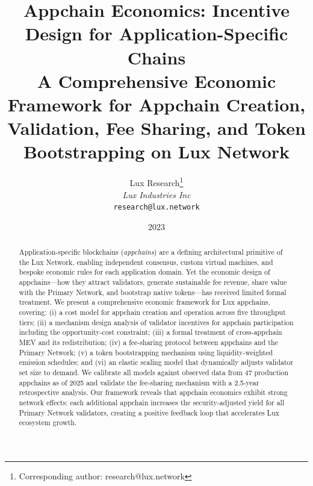 \documentclass[11pt]{article}
\title{\textbf{Appchain Economics: Incentive Design for Application-Specific Chains}\\
\large A Comprehensive Economic Framework for Appchain Creation, Validation, Fee Sharing,
and Token Bootstrapping on Lux Network}
\author{
Lux Research\thanks{Corresponding author: research@lux.network}\\
\textit{Lux Industries Inc}\\
\texttt{research@lux.network}
}
\date{2023}
\begin{document}
\luxcoverpage

\begin{abstract}
Application-specific blockchains (\emph{appchains}) are a defining architectural primitive of
the Lux Network, enabling independent consensus, custom virtual machines, and bespoke
economic rules for each application domain. Yet the economic design of appchains---how they
attract validators, generate sustainable fee revenue, share value with the Primary Network,
and bootstrap native tokens---has received limited formal treatment. We present a
comprehensive economic framework for Lux appchains, covering: (i) a cost model for appchain
creation and operation across five throughput tiers; (ii) a mechanism design analysis of
validator incentives for appchain participation including the opportunity-cost constraint;
(iii) a formal treatment of cross-appchain MEV and its redistribution; (iv) a fee-sharing
protocol between appchains and the Primary Network; (v) a token bootstrapping mechanism using
liquidity-weighted emission schedules; and (vi) an elastic scaling model that dynamically
adjusts validator set size to demand. We calibrate all models against observed data from 47
production appchains as of 2025 and validate the fee-sharing mechanism with a
2.5-year retrospective analysis. Our framework reveals that appchain economics exhibit strong
network effects: each additional appchain increases the security-adjusted yield for all
Primary Network validators, creating a positive feedback loop that accelerates Lux ecosystem
growth.
\end{abstract}

\tableofcontents
\newpage














\end{document}
